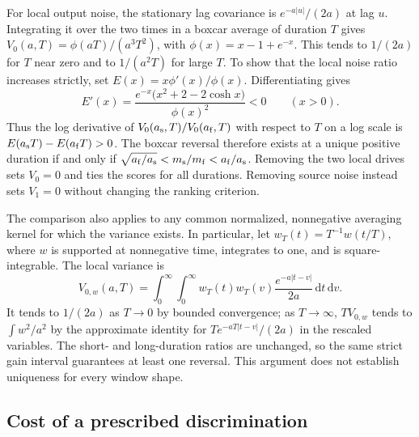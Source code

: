 \documentclass[aps,10pt,onecolumn,superscriptaddress,nofootinbib,
  longbibliography,amsmath,amssymb,floatfix]{revtex4-2}
\newcommand{\dd}{\mathrm{d}}
\begin{document}
For local output noise, the stationary lag covariance is
\(e^{-a|u|}/(2a)\) at lag \(u\). Integrating it over the two
times in a boxcar average of duration \(T\) gives
\(V_0(a,T)=\phi(aT)/(a^3T^2)\), with
\(\phi(x)=x-1+e^{-x}\). This tends to \(1/(2a)\) for \(T\) near
zero and to \(1/(a^2T)\) for large \(T\). To show that the
local noise ratio increases strictly, set
\(E(x)=x\phi'(x)/\phi(x)\). Differentiating gives
\[
 E'(x)=\frac{e^{-x}\big(x^2+2-2\cosh x\big)}{\phi(x)^2}<0
 \qquad (x>0).
\]
Thus the log derivative of
\(V_0(a_{\rm s},T)/V_0(a_{\rm f},T)\) with respect to \(T\)
on a log scale is \(E(a_{\rm s}T)-E(a_{\rm f}T)>0\).
The boxcar reversal therefore exists at a unique positive
duration if and only if
\(\sqrt{a_{\rm f}/a_{\rm s}}<m_{\rm s}/m_{\rm f}<a_{\rm f}/a_{\rm s}\).
Removing the two local drives sets \(V_0=0\) and ties the
scores for all durations. Removing source noise instead sets
\(V_1=0\) without changing the ranking criterion.

The comparison also applies to any common normalized,
nonnegative averaging kernel for which the variance exists.
In particular, let \(w_T(t)=T^{-1}w(t/T)\), where \(w\)
is supported at nonnegative time, integrates to one, and
is square-integrable. The local variance is
\[
 V_{0,w}(a,T)=
 \int_0^\infty\!\!\int_0^\infty
 w_T(t)w_T(v)\frac{e^{-a|t-v|}}{2a}\,\dd t\,\dd v .
\]
It tends to \(1/(2a)\) as \(T\to0\) by bounded convergence;
as \(T\to\infty\), \(T V_{0,w}\) tends to
\(\int w^2/a^2\) by the approximate identity for
\(T e^{-aT|t-v|}/(2a)\) in the rescaled variables.
The short- and long-duration ratios are unchanged, so the same
strict gain interval guarantees at least one reversal. This
argument does not establish uniqueness for every window shape.

\subsection{Cost of a prescribed discrimination}
\end{document}
